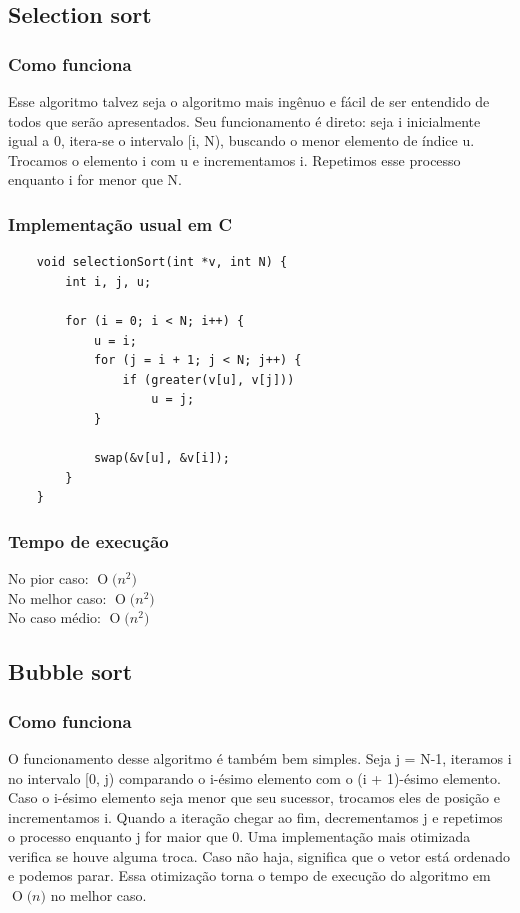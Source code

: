 \documentclass[12pt,a4paper]{article}
\newcommand{\BigO}[1]{\ensuremath{\operatorname{O}\bigl(#1\bigr)}}
\begin{document}
	\subsection{Selection sort}

	\subsubsection{Como funciona}
	\indent Esse algoritmo talvez seja o algoritmo mais ingênuo e fácil de ser entendido de todos que serão apresentados. Seu funcionamento é direto: seja i inicialmente igual a 0, itera-se o intervalo [i, N), buscando o menor elemento de índice u. Trocamos o elemento i com u e incrementamos i. Repetimos esse processo enquanto i for menor que N.

	\subsubsection{Implementação usual em C}
	\begin{minipage}{\linewidth}
	\begin{lstlisting}
	void selectionSort(int *v, int N) {
		int i, j, u;

		for (i = 0; i < N; i++) {
			u = i;
			for (j = i + 1; j < N; j++) {
				if (greater(v[u], v[j]))
					u = j;
			}

			swap(&v[u], &v[i]);
		}
	}
	\end{lstlisting}
	\end{minipage}

	\subsubsection{Tempo de execução}
	\indent No pior caso: \BigO{n^2}\\
	\indent No melhor caso: \BigO{n^2}\\
	\indent No caso médio: \BigO{n^2}



	\subsection{Bubble sort}

	\subsubsection{Como funciona}
	\indent O funcionamento desse algoritmo é também bem simples. Seja j = N-1, iteramos i no intervalo [0, j) comparando o i-ésimo elemento com o (i + 1)-ésimo elemento. Caso o i-ésimo elemento seja menor que seu sucessor, trocamos eles de posição e incrementamos i. Quando a iteração chegar ao fim, decrementamos j e repetimos o processo enquanto j for maior que 0. Uma implementação mais otimizada verifica se houve alguma troca. Caso não haja, significa que o vetor está ordenado e podemos parar. Essa otimização torna o tempo de execução do algoritmo em \BigO{n} no melhor caso.
\end{document}
